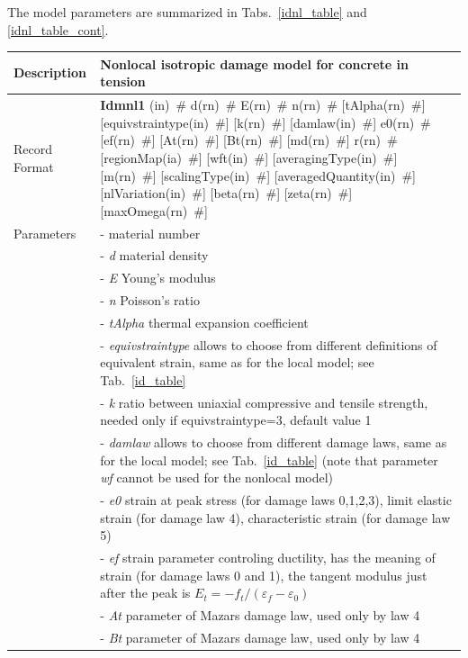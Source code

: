 \documentclass[a4paper]{article}
\newcommand{\descitem}[1]{{\noindent \bf #1}}
\newcommand{\elemparam}[2]{{{#1\tiny (#2)}~\#}}
\newcommand{\param}[1]{{\it #1}}
\newenvironment{mmt}{\begin{tabular}{|l|p{9cm}|}}{\end{tabular}\\}
\newenvironment{mmt}{\begin{tabular}{|l|l|}}{\end{tabular}\\}
\begin{document}
The model parameters are summarized
in Tabs.~\ref{idnl_table} and \ref{idnl_table_cont}.


\begin{table}[!htb]
\begin{mmt}
\hline
Description & Nonlocal isotropic damage model for concrete in tension\\
\hline
Record Format & \descitem{Idmnl1} 
\elemparam{}{in} 
\elemparam{d}{rn} 
\elemparam{E}{rn}
\elemparam{n}{rn}  
[\elemparam{tAlpha}{rn}]
[\elemparam{equivstraintype}{in}] 
[\elemparam{k}{rn}] 
[\elemparam{damlaw}{in}] 
\elemparam{e0}{rn}
[\elemparam{ef}{rn}] 
[\elemparam{At}{rn}] 
[\elemparam{Bt}{rn}] 
[\elemparam{md}{rn}] 
\elemparam{r}{rn}
[\elemparam{regionMap}{ia}]
[\elemparam{wft}{in}]
[\elemparam{averagingType}{in}]
[\elemparam{m}{rn}]
[\elemparam{scalingType}{in}]
[\elemparam{averagedQuantity}{in}]
[\elemparam{nlVariation}{in}]
[\elemparam{beta}{rn}]
[\elemparam{zeta}{rn}]
[\elemparam{maxOmega}{rn}]\\
Parameters &- \param{} material number\\
&- \param{d} material density\\
&- \param{E} Young's modulus\\
&- \param{n} Poisson's ratio\\
&- \param{tAlpha} thermal expansion coefficient\\
&- \param{equivstraintype} allows to choose from different definitions
of equivalent strain, same as for the local model; see Tab.~\ref{id_table}\\
&- \param{k} ratio between uniaxial compressive and tensile strength, needed only if equivstraintype=3, default value 1\\
&- \param{damlaw} allows to choose from different damage laws, 
same as for the local model; see Tab.~\ref{id_table}
(note that parameter {\it wf} cannot be used for the nonlocal model)\\
&- \param{e0} strain at peak stress (for damage laws 0,1,2,3), limit elastic strain (for damage law 4), characteristic strain (for damage law 5)\\
&- \param{ef} strain parameter controling ductility, has the meaning of strain (for damage laws 0 and 1), the tangent modulus just after the peak is
$E_t=-f_t/(\varepsilon_f-\varepsilon_0)$\\
&- \param{At} parameter of Mazars damage law, used only by law 4\\
&- \param{Bt} parameter of Mazars damage law, used only by law 4\\

\end{mmt}
\end{table}
\end{document}
